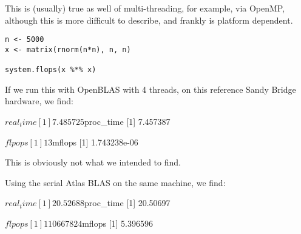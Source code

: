 This is (usually) true as well of multi-threading, for example, via OpenMP, 
although this is more difficult to describe, and frankly is platform dependent.

\begin{lstlisting}[language=rr]
n <- 5000
x <- matrix(rnorm(n*n), n, n)

system.flops(x %*% x)
\end{lstlisting}

If we run this with OpenBLAS with 4 threads, on this reference Sandy Bridge 
hardware, we find:
\begin{Output}
$real_time
[1] 7.485725

$proc_time
[1] 7.457387

$flpops
[1] 13

$mflops
[1] 1.743238e-06
\end{Output}

This is obviously not what we intended to find.  

Using the serial Atlas BLAS on the same machine, we find:
\begin{Output}
$real_time
[1] 20.52688

$proc_time
[1] 20.50697

$flpops
[1] 110667824

$mflops
[1] 5.396596
\end{Output}



